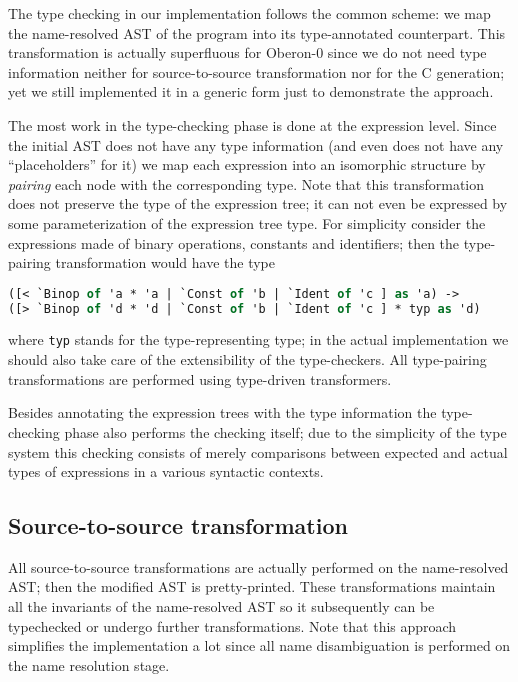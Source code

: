 The type checking in our implementation follows the common scheme: we map the name-resolved
AST of the program into its type-annotated counterpart. This transformation is
actually superfluous for Oberon-0 since we do not need type information neither for
source-to-source transformation nor for the C generation; yet we still implemented it in
a generic form just to demonstrate the approach.

The most work in the type-checking phase is done at the expression level. Since the 
initial AST does not have any type information (and even does not have any ``placeholders'' 
for it) we map each expression into an isomorphic structure by \emph{pairing} each node 
with the corresponding type. Note that this transformation does not preserve the type of
the expression tree; it can not even be expressed by some parameterization of the
expression tree type. For simplicity consider the expressions made of binary operations,
constants and identifiers; then the type-pairing transformation would have the type

\begin{lstlisting}[language=ocaml]
([< `Binop of 'a * 'a | `Const of 'b | `Ident of 'c ] as 'a) ->
([> `Binop of 'd * 'd | `Const of 'b | `Ident of 'c ] * typ as 'd)
\end{lstlisting}

where \lstinline{typ} stands for the type-representing type; in the actual implementation
we should also take care of the extensibility of the type-checkers. All type-pairing
transformations are performed using type-driven transformers.

Besides annotating the expression trees with the type information the type-checking 
phase also performs the checking itself; due to the simplicity of the type system
this checking consists of merely comparisons between expected and actual types of expressions
in a various syntactic contexts.


\subsection{Source-to-source transformation}

All source-to-source transformations are actually performed on the name-resolved AST; then
the modified AST is pretty-printed. These transformations maintain all the invariants of
the name-resolved AST so it subsequently can be typechecked or undergo further 
transformations. Note that this approach simplifies the implementation a lot since all name 
disambiguation is performed on the name resolution stage.

